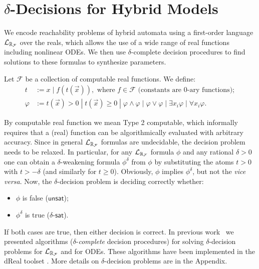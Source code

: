 \section{$\delta$-Decisions for Hybrid Models}
We encode reachability problems of hybrid automata using a first-order language $\mathcal{L}_{\mathbb{R}_{\mathcal{F}}}$ over the reals, 
which allows the use of a wide range of real functions including nonlinear ODEs. 
We then use $\delta$-complete decision procedures to find solutions to these formulas to synthesize 
parameters. 

\begin{definition}
Let $\mathcal{F}$ be a collection of computable real functions. We define:
\begin{align*}
t& := x \; | \; f(t(\vec x)), \mbox{ where }f\in \mathcal{F} \mbox{ (constants are 0-ary functions)};\\
\varphi& := t(\vec x)> 0 \; | \; t(\vec x)\geq 0 \; | \; \varphi\wedge\varphi
\; | \; \varphi\vee\varphi \; | \; \exists x_i\varphi \; |\; \forall x_i\varphi.
\end{align*}
\end{definition}
By computable real function we mean Type 2 computable, which informally requires that a (real) 
function can be algorithmically evaluated with arbitrary accuracy. Since in general 
$\mathcal{L}_{\mathbb{R}_{\mathcal{F}}}$ formulas are undecidable, the decision problem needs to be relaxed. In particular, for 
any $\mathcal{L}_{\mathbb{R}_{\mathcal{F}}}$ formula $\phi$ and any rational $\delta >0$ one can obtain a $\delta$-weakening 
formula $\phi^\delta$ from $\phi$ by substituting the atoms $t > 0$ with $t > -\delta$ (and
similarly for $t \geq 0$). Obviously, $\phi$ implies $\phi^\delta$, but not the {\em vice versa}.
Now, the $\delta$-decision problem is deciding correctly whether:
\begin{itemize}
	\item $\phi$ is false ($\mathsf{unsat}$);
	\item $\phi^\delta$ is true ($\delta$-$\mathsf{sat}$).
\end{itemize}
If both cases are true, then either decision is correct. In previous work~\cite{gao12a,gao12b,gao13}
we presented algorithms ($\delta$-{\em complete} decision procedures) for solving $\delta$-decision 
problems for $\mathcal{L}_{\mathbb{R}_{\mathcal{F}}}$ and for ODEs. These algorithms have been implemented in the dReal 
toolset \cite{dreal}. More details on $\delta$-decision problems are in the Appendix. 

